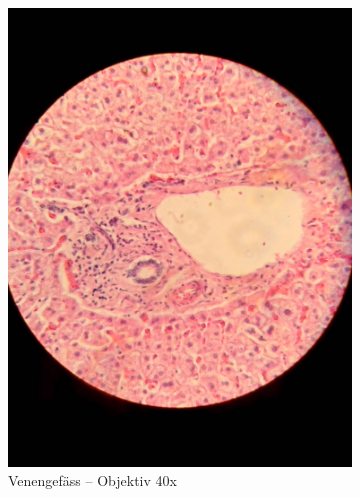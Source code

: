 \begin{figure}[h!]
	\begin{subfigure}[b]{0.3\textwidth}
		\includegraphics[width=1\textwidth]{../images/07_human_liver.jpg}
		\caption{Venengefäss -- Objektiv 40x}
		\label{fig:07_human_liver}
	\end{subfigure}
	\begin{subfigure}[b]{0.3\textwidth}

\end{subfigure}
\end{figure}
